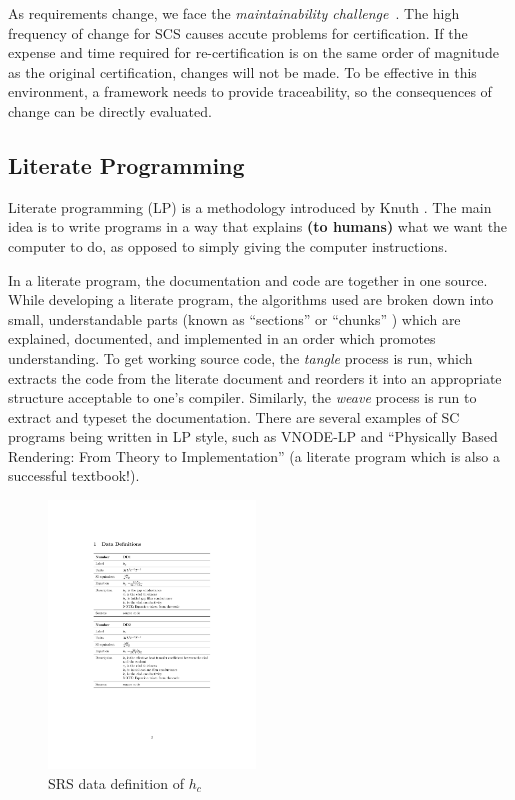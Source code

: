 \documentclass{sig-alternate-05-2015}
\begin{document}
As requirements change, we face the \textit{maintainability
challenge}~\cite{Yu2011}.  The high frequency of change for SCS
causes accute problems for certification. If the expense and time required for
re-certification is on the same order of magnitude as the original
certification, changes will not be made. To be effective in this environment, a
framework needs to provide traceability, so the consequences of change can be
directly evaluated.

\subsection{Literate Programming} \label{ssec:literate}

Literate programming (LP) is a methodology introduced by Knuth
\cite{Knuth1984}. The main idea is to write programs in a way that explains 
{\bf (to humans)} what we want the computer to do, as opposed to simply giving
the computer instructions.

In a literate program, the documentation and code are together in one source.
While developing a literate program, the algorithms used are broken down into
small, understandable parts (known as ``sections'' \cite{Knuth1984} or
``chunks'' \cite{JohnsonAndJohnson1997}) which are explained, documented, and
implemented in an order which promotes understanding. To get working source
code, the \textit{tangle} process is run, which extracts the code from the
literate document and reorders it into an appropriate structure acceptable
to one's compiler.  Similarly, the \textit{weave} process is run to extract and
typeset the documentation.
There are several examples of SC programs being written in LP style, such as
VNODE-LP \cite{Nedialkov2006} and ``Physically Based Rendering: From Theory to
Implementation'' \cite{PharrAndHumphreys2004} (a literate program which is also
a successful textbook!).

\begin{figure}
\includegraphics[width=0.49\textwidth]{h_c.pdf}
\caption{SRS data definition of $h_c$}
\label{fig:h_c}
\end{figure}	
\end{document}
